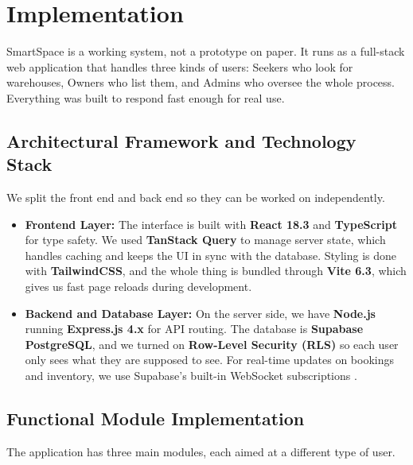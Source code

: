 \documentclass[conference]{IEEEtran}
\begin{document}
\section{Implementation}
SmartSpace is a working system, not a prototype on paper. It runs as a full-stack web application that handles three kinds of users: Seekers who look for warehouses, Owners who list them, and Admins who oversee the whole process. Everything was built to respond fast enough for real use.

\subsection{Architectural Framework and Technology Stack}
We split the front end and back end so they can be worked on independently.
\begin{itemize}
    \item \textbf{Frontend Layer:} The interface is built with \textbf{React 18.3} and \textbf{TypeScript} for type safety. We used \textbf{TanStack Query} to manage server state, which handles caching and keeps the UI in sync with the database. Styling is done with \textbf{TailwindCSS}, and the whole thing is bundled through \textbf{Vite 6.3}, which gives us fast page reloads during development.
    \item \textbf{Backend and Database Layer:} On the server side, we have \textbf{Node.js} running \textbf{Express.js 4.x} for API routing. The database is \textbf{Supabase PostgreSQL}, and we turned on \textbf{Row-Level Security (RLS)} so each user only sees what they are supposed to see. For real-time updates on bookings and inventory, we use Supabase's built-in WebSocket subscriptions \cite{b6}.
\end{itemize}

\subsection{Functional Module Implementation}
The application has three main modules, each aimed at a different type of user.
\end{document}
